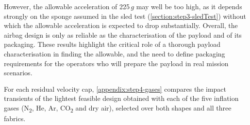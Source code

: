 However, the allowable acceleration of 225\,$g$ may well be too high, as it depends strongly on the sponge assumed in the sled test (\cref{section:step3-sledTest}) without which the allowable acceleration is expected to drop substantially. Overall, the airbag design is only as reliable as the characterisation of the payload and of its packaging. These results highlight the critical role of a thorough payload characterisation in finding the allowable, and the need to define packaging requirements for the operators who will prepare the payload in real mission scenarios.

For each residual velocity cap, \cref{appendix:step4-gases} compares the impact transients of the lightest feasible design obtained with each of the five inflation gases (N\textsubscript{2}, He, Ar, CO\textsubscript{2} and dry air), selected over both shapes and all three fabrics.





